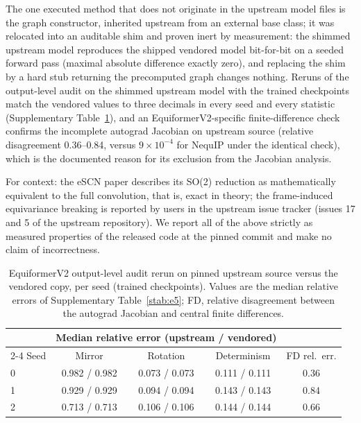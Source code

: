 The one executed method that does not originate in the upstream model files is the graph constructor, inherited upstream from an external base class; it was relocated into an auditable shim and proven inert by measurement: the shimmed upstream model reproduces the shipped vendored model bit-for-bit on a seeded forward pass (maximal absolute difference exactly zero), and replacing the shim by a hard stub returning the precomputed graph changes nothing. Reruns of the output-level audit on the shimmed upstream model with the trained checkpoints match the vendored values to three decimals in every seed and every statistic (Supplementary Table~\ref{stab:h1}), and an EquiformerV2-specific finite-difference check confirms the incomplete autograd Jacobian on upstream source (relative disagreement 0.36--0.84, versus $9\times10^{-4}$ for NequIP under the identical check), which is the documented reason for its exclusion from the Jacobian analysis.

For context: the eSCN paper describes its SO(2) reduction as mathematically equivalent to the full convolution, that is, exact in theory; the frame-induced equivariance breaking is reported by users in the upstream issue tracker (issues 17 and 5 of the upstream repository). We report all of the above strictly as measured properties of the released code at the pinned commit and make no claim of incorrectness.

\begin{table}[htbp]
\centering
\caption{EquiformerV2 output-level audit rerun on pinned upstream source versus the vendored copy, per seed (trained checkpoints). Values are the median relative errors of Supplementary Table~\ref{stab:e5}; FD, relative disagreement between the autograd Jacobian and central finite differences.}
\label{stab:h1}
\scriptsize
\begin{tabular}{@{}l ccc c@{}}
\toprule
 & \multicolumn{3}{c}{Median relative error (upstream / vendored)} & \\
\cmidrule(lr){2-4}
Seed & Mirror & Rotation & Determinism & FD rel.\ err. \\
\midrule
0 & 0.982 / 0.982 & 0.073 / 0.073 & 0.111 / 0.111 & 0.36 \\
1 & 0.929 / 0.929 & 0.094 / 0.094 & 0.143 / 0.143 & 0.84 \\
2 & 0.713 / 0.713 & 0.106 / 0.106 & 0.144 / 0.144 & 0.66 \\
\bottomrule
\end{tabular}

\end{table}

